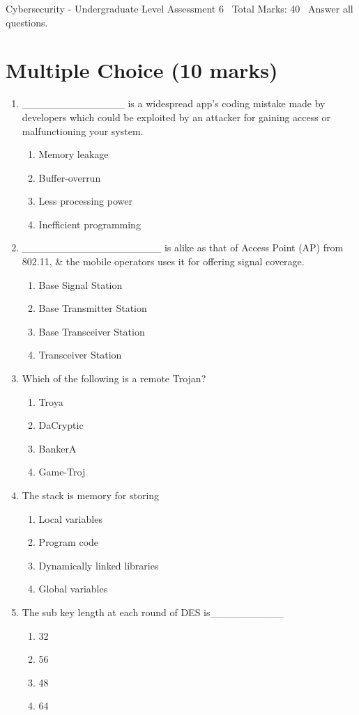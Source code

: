 \documentclass[12pt]{article}
\begin{document}
\begin{center}
Cybersecurity - Undergraduate Level Assessment 6 \
Total Marks: 40 \
Answer all questions.
\end{center}

\section*{Multiple Choice (10 marks)}
\begin{enumerate}[label=\arabic*.]
\item \_\_\_\_\_\_\_\_\_\_\_\_\_\_ is a widespread app's coding mistake made by developers which could be exploited by an attacker for gaining access or malfunctioning your system.
\begin{enumerate}[label=(\alph*)]
    \item Memory leakage
    \item Buffer-overrun
    \item Less processing power
    \item Inefficient programming
\end{enumerate}
\item \_\_\_\_\_\_\_\_\_\_\_\_\_\_\_\_\_\_\_ is alike as that of Access Point (AP) from 802.11, \& the mobile operators uses it for offering signal coverage.
\begin{enumerate}[label=(\alph*)]
    \item Base Signal Station
    \item Base Transmitter Station
    \item Base Transceiver Station
    \item Transceiver Station
\end{enumerate}
\item Which of the following is a remote Trojan?
\begin{enumerate}[label=(\alph*)]
    \item Troya
    \item DaCryptic
    \item BankerA
    \item Game-Troj
\end{enumerate}
\item The stack is memory for storing
\begin{enumerate}[label=(\alph*)]
    \item Local variables
    \item Program code
    \item Dynamically linked libraries
    \item Global variables
\end{enumerate}
\item The sub key length at each round of DES is\_\_\_\_\_\_\_\_\_\_
\begin{enumerate}[label=(\alph*)]
    \item 32
    \item 56
    \item 48
    \item 64
\end{enumerate}
\end{enumerate}
\end{document}
